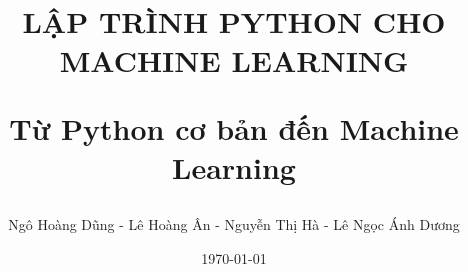 \documentclass[12pt,a4paper,oneside]{book}
\begin{document}

\frontmatter

\title{
    \Huge\textbf{LẬP TRÌNH PYTHON CHO MACHINE LEARNING}
    
    \vspace{1cm}
    
    \large Từ Python cơ bản đến Machine Learning
}

\author{Ngô Hoàng Dũng - Lê Hoàng Ân - Nguyễn Thị Hà - Lê Ngọc Ánh Dương}

\date{\today}

\maketitle

\tableofcontents


\mainmatter















\backmatter
\end{document}
